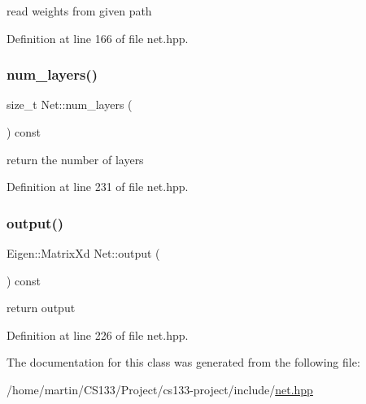 read weights from given path 



Definition at line 166 of file net.\+hpp.

\mbox{\label{class_net_a85b0b4ea81ac28ab5bff04bae96dfb5a}} 
\subsubsection{\texorpdfstring{num\+\_\+layers()}{num\_layers()}}
{\footnotesize\ttfamily size\+\_\+t Net\+::num\+\_\+layers (\begin{DoxyParamCaption}{ }\end{DoxyParamCaption}) const}



return the number of layers 



Definition at line 231 of file net.\+hpp.

\mbox{\label{class_net_af4a35015a68b1a2637ec07180ecc615e}} 
\subsubsection{\texorpdfstring{output()}{output()}}
{\footnotesize\ttfamily Eigen\+::\+Matrix\+Xd Net\+::output (\begin{DoxyParamCaption}{ }\end{DoxyParamCaption}) const}



return output 



Definition at line 226 of file net.\+hpp.



The documentation for this class was generated from the following file\+:\begin{DoxyCompactItemize}
\item 
/home/martin/\+C\+S133/\+Project/cs133-\/project/include/\hyperlink{_net_8hpp}{net.\+hpp}\end{DoxyCompactItemize}
